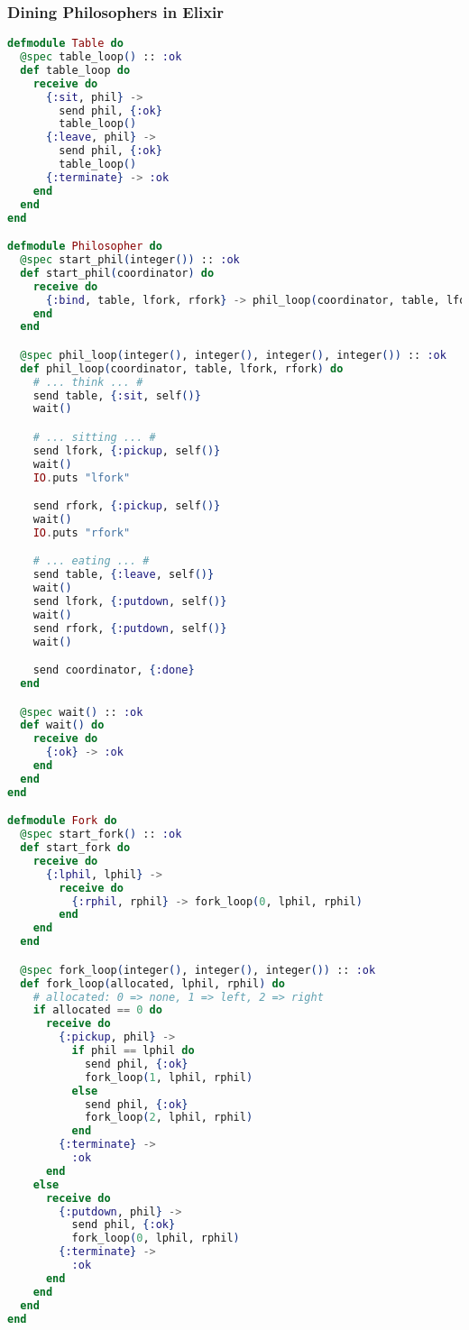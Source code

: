 \subsubsection{Dining Philosophers in Elixir}
\begin{lstlisting}[language=Elixir, xleftmargin=.1\linewidth]
defmodule Table do
  @spec table_loop() :: :ok
  def table_loop do
    receive do
      {:sit, phil} ->
        send phil, {:ok}
        table_loop()
      {:leave, phil} ->
        send phil, {:ok}
        table_loop()
      {:terminate} -> :ok
    end
  end
end

defmodule Philosopher do
  @spec start_phil(integer()) :: :ok
  def start_phil(coordinator) do
    receive do
      {:bind, table, lfork, rfork} -> phil_loop(coordinator, table, lfork, rfork)
    end
  end

  @spec phil_loop(integer(), integer(), integer(), integer()) :: :ok
  def phil_loop(coordinator, table, lfork, rfork) do
    # ... think ... #
    send table, {:sit, self()}
    wait()

    # ... sitting ... #
    send lfork, {:pickup, self()}
    wait()
    IO.puts "lfork"

    send rfork, {:pickup, self()}
    wait()
    IO.puts "rfork"

    # ... eating ... #
    send table, {:leave, self()}
    wait()
    send lfork, {:putdown, self()}
    wait()
    send rfork, {:putdown, self()}
    wait()

    send coordinator, {:done}
  end

  @spec wait() :: :ok
  def wait() do
    receive do
      {:ok} -> :ok
    end
  end
end

defmodule Fork do
  @spec start_fork() :: :ok
  def start_fork do
    receive do
      {:lphil, lphil} ->
        receive do
          {:rphil, rphil} -> fork_loop(0, lphil, rphil)
        end
    end
  end

  @spec fork_loop(integer(), integer(), integer()) :: :ok
  def fork_loop(allocated, lphil, rphil) do
    # allocated: 0 => none, 1 => left, 2 => right
    if allocated == 0 do
      receive do
        {:pickup, phil} ->
          if phil == lphil do
            send phil, {:ok}
            fork_loop(1, lphil, rphil)
          else
            send phil, {:ok}
            fork_loop(2, lphil, rphil)
          end
        {:terminate} ->
          :ok
      end
    else
      receive do
        {:putdown, phil} ->
          send phil, {:ok}
          fork_loop(0, lphil, rphil)
        {:terminate} ->
          :ok
      end
    end
  end
end



\end{lstlisting}
